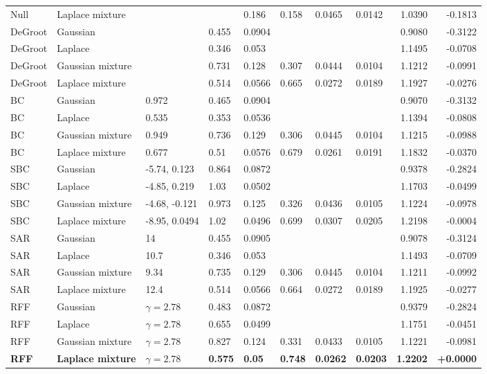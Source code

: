 \begin{longtable}{llllllllrr}
Null & Laplace mixture &  &  & 0.186 & 0.158 & 0.0465 & 0.0142 & 1.0390 & -0.1813 \\
DeGroot & Gaussian &  & 0.455 & 0.0904 &  &  &  & 0.9080 & -0.3122 \\
DeGroot & Laplace &  & 0.346 & 0.053 &  &  &  & 1.1495 & -0.0708 \\
DeGroot & Gaussian mixture &  & 0.731 & 0.128 & 0.307 & 0.0444 & 0.0104 & 1.1212 & -0.0991 \\
DeGroot & Laplace mixture &  & 0.514 & 0.0566 & 0.665 & 0.0272 & 0.0189 & 1.1927 & -0.0276 \\
BC & Gaussian & 0.972 & 0.465 & 0.0904 &  &  &  & 0.9070 & -0.3132 \\
BC & Laplace & 0.535 & 0.353 & 0.0536 &  &  &  & 1.1394 & -0.0808 \\
BC & Gaussian mixture & 0.949 & 0.736 & 0.129 & 0.306 & 0.0445 & 0.0104 & 1.1215 & -0.0988 \\
BC & Laplace mixture & 0.677 & 0.51 & 0.0576 & 0.679 & 0.0261 & 0.0191 & 1.1832 & -0.0370 \\
SBC & Gaussian & -5.74, 0.123 & 0.864 & 0.0872 &  &  &  & 0.9378 & -0.2824 \\
SBC & Laplace & -4.85, 0.219 & 1.03 & 0.0502 &  &  &  & 1.1703 & -0.0499 \\
SBC & Gaussian mixture & -4.68, -0.121 & 0.973 & 0.125 & 0.326 & 0.0436 & 0.0105 & 1.1224 & -0.0978 \\
SBC & Laplace mixture & -8.95, 0.0494 & 1.02 & 0.0496 & 0.699 & 0.0307 & 0.0205 & 1.2198 & -0.0004 \\
SAR & Gaussian & 14 & 0.455 & 0.0905 &  &  &  & 0.9078 & -0.3124 \\
SAR & Laplace & 10.7 & 0.346 & 0.053 &  &  &  & 1.1493 & -0.0709 \\
SAR & Gaussian mixture & 9.34 & 0.735 & 0.129 & 0.306 & 0.0445 & 0.0104 & 1.1211 & -0.0992 \\
SAR & Laplace mixture & 12.4 & 0.514 & 0.0566 & 0.664 & 0.0272 & 0.0189 & 1.1925 & -0.0277 \\
RFF & Gaussian & $\gamma=2.78$ & 0.483 & 0.0872 &  &  &  & 0.9379 & -0.2824 \\
RFF & Laplace & $\gamma=2.78$ & 0.655 & 0.0499 &  &  &  & 1.1751 & -0.0451 \\
RFF & Gaussian mixture & $\gamma=2.78$ & 0.827 & 0.124 & 0.331 & 0.0433 & 0.0105 & 1.1221 & -0.0981 \\
\textbf{RFF} & \textbf{Laplace mixture} & \textbf{$\gamma=2.78$} & \textbf{0.575} & \textbf{0.05} & \textbf{0.748} & \textbf{0.0262} & \textbf{0.0203} & \textbf{1.2202} & \textbf{+0.0000} \\

\end{longtable}
